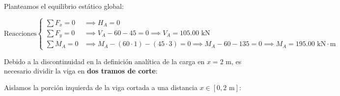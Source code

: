 Planteamos el equilibrio estático global:

\begin{equation}

    \text{Reacciones} \left\{

    \begin{aligned}

        \sum F_x = 0 & \implies \boxed{H_A = 0}                                                                                                        \\[6pt]

        \sum F_y = 0 & \implies V_A - 60 - 45 = 0 \implies \boxed{V_A = 105.00\text{ kN}}                                                              \\[6pt]

        \sum M_A = 0 & \implies M_A - (60 \cdot 1) - (45 \cdot 3) = 0 \implies M_A - 60 - 135 = 0 \implies \boxed{M_A = 195.00\text{ kN}\cdot\text{m}}

    \end{aligned}

    \right.

\end{equation}






Debido a la discontinuidad en la definición analítica de la carga en $x = 2\text{ m}$, es necesario dividir la viga en \textbf{dos tramos de corte}:






Aislamos la porción izquierda de la viga cortada a una distancia $x \in [0, 2\text{ m}]$:



